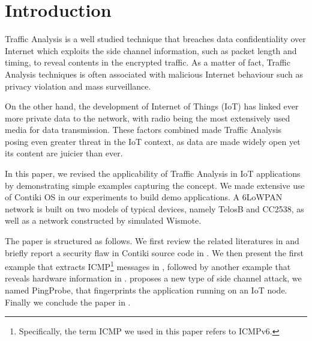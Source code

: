 \section{Introduction}
Traffic Analysis is a well studied technique that breaches data confidentiality over Internet which exploits the side channel information, such as packet length and timing, to reveal contents in the encrypted traffic. As a matter of fact, Traffic Analysis techniques is often associated with malicious Internet behaviour such as privacy violation and mass surveillance. 


On the other hand, the development of Internet of Things (IoT) has linked ever more private data to the network, with radio being the most extensively used media for data transmission. These factors combined made Traffic Analysis posing even greater threat in the IoT context, as data are made widely open yet its content are juicier than ever.


In this paper, we revised the applicability of Traffic Analysis in IoT applications by demonstrating simple examples capturing the concept. We made extensive use of Contiki OS\cite{Contiki} in our experiments to build demo applications. A 6LoWPAN\cite{rfc4944} network is built on two models of typical devices, namely TelosB\cite{TelosB} and CC2538\cite{CC2538}, as well as a network constructed by simulated Wismote\cite{Wismote}. 

The paper is structured as follows. We first review the related literatures in  and briefly report a security flaw in Contiki source code in . We then present the first example that extracts ICMP\footnote{Specifically, the term ICMP we used in this paper refers to ICMPv6.}\cite{rfc4443} messages in , followed by another example that reveals hardware information in .  proposes a new type of side channel attack, we named PingProbe, that fingerprints the application running on an IoT node. Finally we conclude the paper in .

